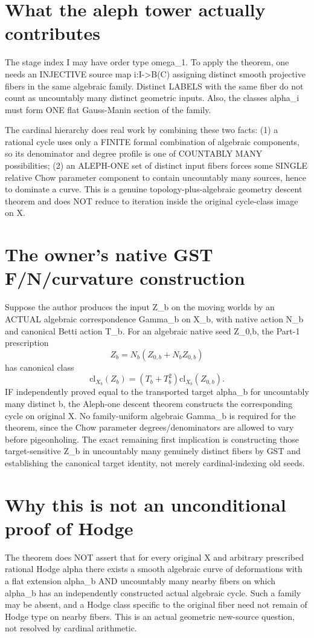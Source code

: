 \documentclass[11pt]{article}
\begin{document}
\section{What the aleph tower actually contributes}
The stage index I may have order type omega_1.
To apply the theorem, one needs an INJECTIVE
source map i:I->B(C) assigning distinct
smooth projective fibers in the same
algebraic family. Distinct LABELS with the
same fiber do not count as uncountably
many distinct geometric inputs.
Also, the classes alpha_i must form ONE
flat Gauss-Manin section of the family.

The cardinal hierarchy does real work by
combining these two facts:
(1) a rational cycle uses only a FINITE
formal combination of algebraic components,
so its denominator and degree profile is
one of COUNTABLY MANY possibilities;
(2) an ALEPH-ONE set of distinct input
fibers forces some SINGLE relative Chow
parameter component to contain uncountably
many sources, hence to dominate a curve.
This is a genuine topology-plus-algebraic
geometry descent theorem and does NOT
reduce to iteration inside the original
cycle-class image on X.

\section{The owner's native GST F/N/curvature construction}
Suppose the author produces the input Z_b
on the moving worlds by an ACTUAL algebraic
correspondence Gamma_b on X_b, with native
action N_b and canonical Betti action T_b.
For an algebraic native seed Z_{0,b},
the Part-1 prescription
\[
Z_b=N_b(Z_{0,b}+N_b Z_{0,b})
\]
has canonical class
\[
\mathrm{cl}_{X_b}(Z_b)
=(T_b+T_b^2)\mathrm{cl}_{X_b}(Z_{0,b}).
\]
IF independently proved equal to the
transported target alpha_b for
uncountably many distinct b, the
Aleph-one descent theorem constructs
the corresponding cycle on original X.
No family-uniform algebraic Gamma_b
is required for the theorem, since
the Chow parameter degrees/denominators
are allowed to vary before pigeonholing.
The exact remaining first implication
is constructing those target-sensitive
Z_b in uncountably many genuinely distinct
fibers by GST and establishing the
canonical target identity, not
merely cardinal-indexing old seeds.

\section{Why this is not an unconditional proof of Hodge}
The theorem does NOT assert that for every
original X and arbitrary prescribed rational
Hodge alpha there exists a smooth algebraic
curve of deformations with a flat extension
alpha_b AND uncountably many nearby fibers
on which alpha_b has an independently
constructed actual algebraic cycle.
Such a family may be absent, and a Hodge
class specific to the original fiber
need not remain of Hodge type on nearby
fibers. This is an actual geometric
new-source question, not resolved by
cardinal arithmetic.
\end{document}

